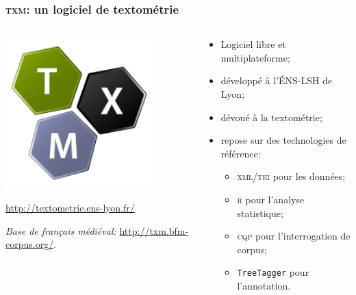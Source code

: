 \documentclass{beamer}
\begin{document}
\begin{frame}[fragile]
\frametitle{\textsc{txm}: un logiciel de textométrie}


\begin{columns}
	\begin{column}{0.30\textwidth}
	\begin{center}
	\includegraphics[width= 0.8\textwidth]{img/txm.png}
	\end{center}

\url{http://textometrie.ens-lyon.fr/}

\textit{Base de français médiéval:} \url{http://txm.bfm-corpus.org/}.
	\end{column}
	\begin{column}{0.66\textwidth}
		\begin{itemize}
			\item Logiciel libre et multiplateforme;
			\item développé à l'ÉNS-LSH de Lyon;
			\item dévoué à la textométrie;
			\item repose sur des technologies de référence:
				\begin{itemize}
					\item \textsc{xml/tei} pour les données;
					\item \textsc{r} pour l'analyse statistique;
					\item \textsc{cqp} pour l'interrogation de corpus;
					\item \texttt{TreeTagger} pour l'annotation.
				\end{itemize}
		\end{itemize}
	\end{column}
\end{columns}
\end{frame}
\end{document}
